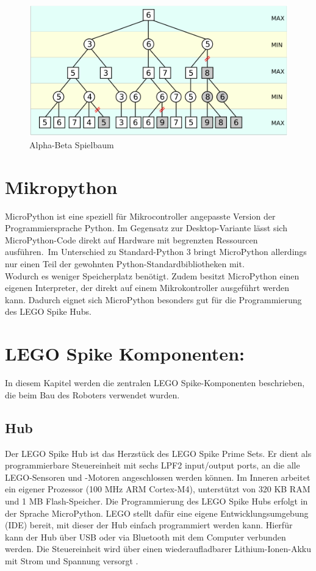 \begin{figure}[H]
	\centering
	\includegraphics[width=1\linewidth]{images/alpha_beta}
	\caption[Alpha-Beta Spielbaum Quelle: \autocite{wikimediaABpruning}]{Alpha-Beta Spielbaum}
	\label{fig:alphabeta}
\end{figure}



\section{Mikropython}
MicroPython ist eine speziell für Mikrocontroller angepasste Version der Programmiersprache Python. Im Gegensatz zur Desktop-Variante lässt sich MicroPython-Code direkt auf Hardware mit begrenzten Ressourcen ausführen\autocite{energy_responsiveness2023}\autocite{Plauska2023}.\
Im Unterschied zu Standard-Python 3 bringt MicroPython allerdings nur einen Teil der gewohnten Python-Standardbibliotheken mit.\\ Wodurch es weniger Speicherplatz benötigt.
Zudem besitzt MicroPython einen eigenen Interpreter, der direkt auf einem Mikrokontroller ausgeführt werden kann.
Dadurch eignet sich MicroPython besonders gut für die Programmierung des LEGO Spike Hubs\autocite{bell2024micropython}.



\section{LEGO Spike Komponenten:}
In diesem Kapitel werden die zentralen LEGO Spike-Komponenten beschrieben, die beim Bau des Roboters verwendet wurden. 

\subsection{Hub}
Der LEGO Spike Hub ist das Herzstück des LEGO Spike Prime Sets. Er dient als programmierbare Steuereinheit mit sechs LPF2 input/output ports, an die alle LEGO-Sensoren und -Motoren angeschlossen werden können. Im Inneren arbeitet ein eigener Prozessor (100 MHz ARM Cortex-M4), unterstützt von 320 KB RAM und 1 MB Flash-Speicher. Die Programmierung des LEGO Spike Hubs erfolgt in der Sprache MicroPython. LEGO stellt dafür eine eigene Entwicklungsumgebung (IDE) bereit, mit dieser der Hub einfach programmiert werden kann. Hierfür kann der Hub über USB oder via Bluetooth mit dem Computer verbunden werden. Die Steuereinheit wird über einen  wiederaufladbarer Lithium-Ionen-Akku mit Strom und Spannung versorgt \autocite{lego2020techniclargehub}.

